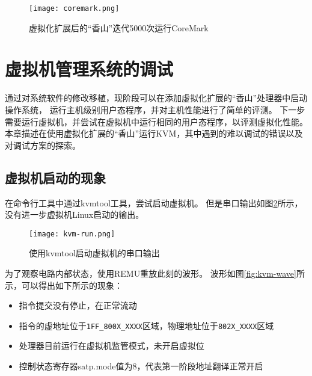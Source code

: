 \begin{figure}[htbp]
    \centering
\texttt{[image: coremark.png]}
\caption{虚拟化扩展后的“香山”迭代5000次运行CoreMark}
\label{fig:coremark}
\end{figure}


\section{虚拟机管理系统的调试}
通过对系统软件的修改移植，现阶段可以在添加虚拟化扩展的“香山”处理器中启动操作系统，
运行主机级别用户态程序，并对主机性能进行了简单的评测。
下一步需要运行虚拟机，并尝试在虚拟机中运行相同的用户态程序，以评测虚拟化性能。
本章描述在使用虚拟化扩展的“香山”运行KVM，其中遇到的难以调试的错误以及对调试方案的探索。

\subsection{虚拟机启动的现象}
在命令行工具中通过kvmtool工具，尝试启动虚拟机。
但是串口输出如图\ref{fig:kvm-run}所示，没有进一步虚拟机Linux启动的输出。

\begin{figure}[htbp]
    \centering
    \texttt{[image: kvm-run.png]}
    \caption{使用kvmtool启动虚拟机的串口输出}
    \label{fig:kvm-run}
\end{figure}

为了观察电路内部状态，使用REMU重放此刻的波形。
波形如图\ref{fig:kvm-wave}所示，可以得出如下所示的现象：

\begin{itemize}
    \item 指令提交没有停止，在正常流动
    \item 指令的虚地址位于\verb|1FF_800X_XXXX|区域，物理地址位于\verb|802X_XXXX|区域
\item 处理器目前运行在虚拟机监管模式，未开启虚拟位
    \item 控制状态寄存器satp.mode值为8，代表第一阶段地址翻译正常开启
\end{itemize}

